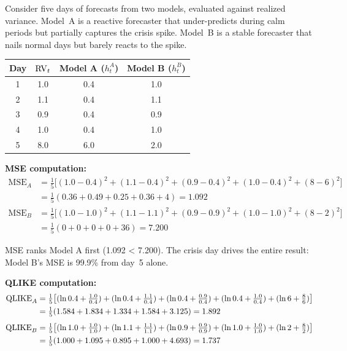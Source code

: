 \begin{workedexample}
Consider five days of forecasts from two models, evaluated against realized variance.
Model~A is a reactive forecaster that under-predicts during calm periods but partially captures the crisis spike.
Model~B is a stable forecaster that nails normal days but barely reacts to the spike.

\medskip
\begin{center}
\begin{tabular}{cccc}
\toprule
Day & $\operatorname{RV}_t$ & Model A ($h^A_t$) & Model B ($h^B_t$) \\
\midrule
1 & 1.0 & 0.4 & 1.0 \\
2 & 1.1 & 0.4 & 1.1 \\
3 & 0.9 & 0.4 & 0.9 \\
4 & 1.0 & 0.4 & 1.0 \\
5 & 8.0 & 6.0 & 2.0 \\
\bottomrule
\end{tabular}
\end{center}
\medskip

\textbf{MSE computation:}
\begin{align*}
\text{MSE}_A &= \tfrac{1}{5}\bigl[(1.0-0.4)^2 + (1.1-0.4)^2 + (0.9-0.4)^2 + (1.0-0.4)^2 + (8-6)^2\bigr] \\
  &= \tfrac{1}{5}(0.36 + 0.49 + 0.25 + 0.36 + 4) = 1.092 \\[4pt]
\text{MSE}_B &= \tfrac{1}{5}\bigl[(1.0-1.0)^2 + (1.1-1.1)^2 + (0.9-0.9)^2 + (1.0-1.0)^2 + (8-2)^2\bigr] \\
  &= \tfrac{1}{5}(0 + 0 + 0 + 0 + 36) = 7.200
\end{align*}

MSE ranks Model A first (1.092 < 7.200).
The crisis day drives the entire result: Model B's MSE is 99.9\% from day~5 alone.

\textbf{QLIKE computation:}
\begin{align*}
\operatorname{QLIKE}_A &= \tfrac{1}{5}\bigl[(\ln 0.4 + \tfrac{1.0}{0.4}) + (\ln 0.4 + \tfrac{1.1}{0.4}) + (\ln 0.4 + \tfrac{0.9}{0.4}) + (\ln 0.4 + \tfrac{1.0}{0.4}) + (\ln 6 + \tfrac{8}{6})\bigr] \\
  &= \tfrac{1}{5}(1.584 + 1.834 + 1.334 + 1.584 + 3.125) = 1.892 \\[4pt]
\operatorname{QLIKE}_B &= \tfrac{1}{5}\bigl[(\ln 1.0 + \tfrac{1.0}{1.0}) + (\ln 1.1 + \tfrac{1.1}{1.1}) + (\ln 0.9 + \tfrac{0.9}{0.9}) + (\ln 1.0 + \tfrac{1.0}{1.0}) + (\ln 2 + \tfrac{8}{2})\bigr] \\
  &= \tfrac{1}{5}(1.000 + 1.095 + 0.895 + 1.000 + 4.693) = 1.737
\end{align*}


\end{workedexample}
